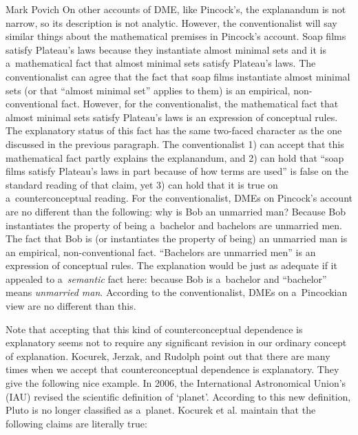 \begin{artengenv}{Mark Povich}
On other accounts of DME, like Pincock's, the explanandum is not narrow, so its description is not analytic. However, the conventionalist will say similar things about the mathematical premises in Pincock's account. Soap films satisfy Plateau's laws because they instantiate almost minimal sets and it is a~mathematical fact that almost minimal sets satisfy Plateau's laws. The conventionalist can agree that the fact that soap films instantiate almost minimal sets (or that ``almost minimal set'' applies to them) is an empirical, non-conventional fact. However, for the conventionalist, the mathematical fact that almost minimal sets satisfy Plateau's laws is an expression of conceptual rules. The explanatory status of this fact has the same two-faced character as the one discussed in the previous paragraph. The conventionalist 1) can accept that this mathematical fact partly explains the explanandum, and 2) can hold that ``soap films satisfy Plateau's laws in part because of how terms are used'' is false on the standard reading of that claim, yet 3) can hold that it is true on a~counterconceptual reading. For the conventionalist, DMEs on Pincock's account are no different than the following: why is Bob an unmarried man? Because Bob instantiates the property of being a~bachelor and bachelors are unmarried men. The fact that Bob is (or instantiates the property of being) an unmarried man is an empirical, non-conventional fact. ``Bachelors are unmarried men'' is an expression of conceptual rules. The explanation would be just as adequate if it appealed to a~\textit{semantic} fact here: because Bob is a~bachelor and ``bachelor'' means \textit{unmarried man}. According to the conventionalist, DMEs on a~Pincockian view are no different than this.

Note that accepting that this kind of counterconceptual dependence is explanatory seems not to require any significant revision in our ordinary concept of explanation. Kocurek, Jerzak, and Rudolph
\parencite*[][p.7]{kocurek_against_2020} %
 point out that there are many times when we accept that counterconceptual dependence is explanatory. They give the following nice example. In 2006, the International Astronomical Union's (IAU) revised the scientific definition of ‘planet'. According to this new definition, Pluto is no longer classified as a~planet. Kocurek et al. maintain that the following claims are literally true:

\begin{quote}


\end{quote}
\end{artengenv}
